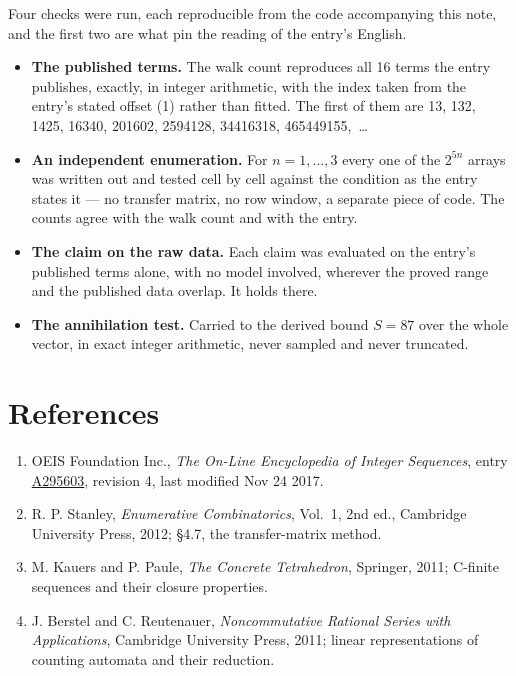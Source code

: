\documentclass[11pt]{article}
\theoremstyle{definition}
\begin{document}
Four checks were run, each reproducible from the code accompanying this note, and the first two are what pin the reading of the entry's English.

\begin{itemize}

\item {\bfseries The published terms.} The walk count reproduces all 16 terms the entry publishes, exactly, in integer arithmetic, with the index taken from the entry's stated offset (1) rather than fitted. The first of them are 13, 132, 1425, 16340, 201602, 2594128, 34416318, 465449155,~\dots

\item {\bfseries An independent enumeration.} For $n = 1,\dots,3$ every one of the $2^{5n}$ arrays was written out and tested cell by cell against the condition as the entry states it --- no transfer matrix, no row window, a separate piece of code. The counts agree with the walk count and with the entry.

\item {\bfseries The claim on the raw data.} Each claim was evaluated on the entry's published terms alone, with no model involved, wherever the proved range and the published data overlap. It holds there.

\item {\bfseries The annihilation test.} Carried to the derived bound $S = 87$ over the whole vector, in exact integer arithmetic, never sampled and never truncated.

\end{itemize}

\section{References}

\begin{enumerate}

\item OEIS Foundation Inc., \emph{The On-Line Encyclopedia of Integer Sequences}, entry \href{https://oeis.org/A295603}{A295603}, revision 4, last modified Nov 24 2017.

\item R. P. Stanley, \emph{Enumerative Combinatorics}, Vol.~1, 2nd ed., Cambridge University Press, 2012; \S4.7, the transfer-matrix method.

\item M. Kauers and P. Paule, \emph{The Concrete Tetrahedron}, Springer, 2011; C-finite sequences and their closure properties.

\item J. Berstel and C. Reutenauer, \emph{Noncommutative Rational Series with Applications}, Cambridge University Press, 2011; linear representations of counting automata and their reduction.

\end{enumerate}
\end{document}
